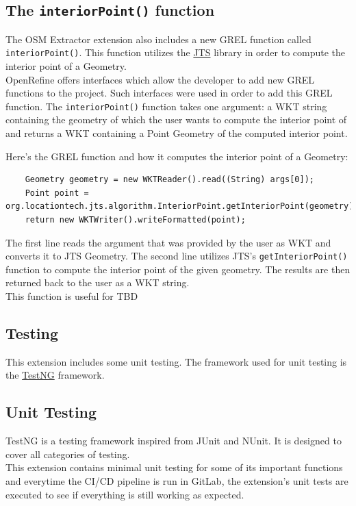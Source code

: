 \subsection{The \texttt{interiorPoint()} function}
The OSM Extractor extension also includes a new GREL function called \texttt{interiorPoint()}. This function
utilizes the \href{https://github.com/locationtech/jts}{JTS} library in order to compute the interior point of a Geometry.\\
\newline
OpenRefine offers interfaces which allow the developer to add new GREL functions to the project. Such interfaces were used in order
to add this GREL function. The \texttt{interiorPoint()} function takes one argument: a WKT string containing the geometry
of which the user wants to compute the interior point of and returns a WKT containing a Point Geometry of the computed interior point.\\
\newline

Here's the GREL function and how it computes the interior point of a Geometry:
\begin{verbatim}
    Geometry geometry = new WKTReader().read((String) args[0]);
    Point point = org.locationtech.jts.algorithm.InteriorPoint.getInteriorPoint(geometry);
    return new WKTWriter().writeFormatted(point);
\end{verbatim}
The first line reads the argument that was provided by the user as WKT and converts it to JTS Geometry.
The second line utilizes JTS's \texttt{getInteriorPoint()} function to compute the interior point of the
given geometry. The results are then returned back to the user as a WKT string.\\
\newline
This function is useful for TBD

\pagebreak
\subsection{Testing}
This extension includes some unit testing. The framework used for unit testing is the \href{https://testng.org/}{TestNG} framework.
\subsection{Unit Testing}
TestNG is a testing framework inspired from JUnit and NUnit. It is designed to cover all categories of testing.\\
This extension contains minimal unit testing for some of its important functions and everytime the CI/CD pipeline is run in GitLab, the
extension's unit tests are executed to see if everything is still working as expected.
\pagebreak
